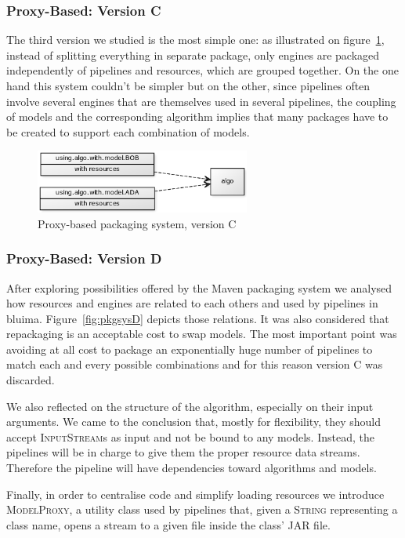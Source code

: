 \documentclass{article}
\newcommand{\ID}[1]{{\textsc{#1}}}
\newcommand{\JAR}{JAR\xspace}
\begin{document}
\begin{appendices}
\subsubsection{Proxy-Based: Version C}

The third version we studied is the most simple one: as illustrated on figure~\ref{fig:pkgsysC},
instead of splitting everything in separate package, only engines are packaged independently of
pipelines and resources, which are grouped together. On the one hand this system couldn't be simpler
but on the other, since pipelines often involve several engines that are themselves used in several
pipelines, the coupling of models and the corresponding algorithm implies that many packages have to
be created to support each combination of models.


\begin{figure}
    \centering
    \includegraphics[width=200pt]{res/packaging_version_C.png}
    \caption{Proxy-based packaging system, version C}
    \label{fig:pkgsysC}
\end{figure}

\subsubsection{Proxy-Based: Version D}

After exploring possibilities offered by the Maven packaging system we analysed how resources and
engines are related to each others and used by pipelines in bluima. Figure~\ref{fig:pkgsysD} depicts
those relations. It was also considered that repackaging is an acceptable cost to swap models. The
most important point was avoiding at all cost to package an exponentially huge number of pipelines
to match each and every possible combinations and for this reason version C was discarded.

We also reflected on the structure of the algorithm, especially on their input arguments. We came to
the conclusion that, mostly for flexibility, they should accept \ID{InputStream}s as input and not
be bound to any models. Instead, the pipelines will be in charge to give them the proper resource
data streams. Therefore the pipeline will have dependencies toward algorithms and models.

Finally, in order to centralise code and simplify loading resources we introduce \ID{ModelProxy}, a
utility class used by pipelines that, given a \ID{String} representing a class name, opens a stream
to a given file inside the class' \JAR file.


\end{appendices}
\end{document}
